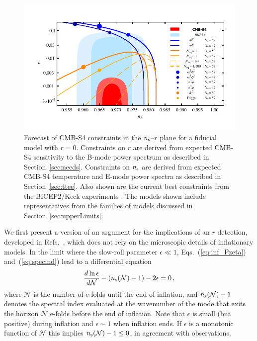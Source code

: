 \begin{figure}[ht]
\centering
\includegraphics[width=6in]{Inflation/nsrlabeledr0v3s}
\caption{Forecast of CMB-S4 constraints in the $n_{\rm s}$--$r$ plane for a fiducial model with $r=0$. Constraints 
on $r$ are derived from expected CMB-S4 sensitivity to the B-mode power spectrum as described in 
Section~\ref{sec:needs}. Constraints on $n_{\rm s}$ are derived from expected CMB-S4 temperature and 
E-mode power spectra as described in Section~\ref{sec:ttee}. Also shown are the current best constraints
from the BICEP2/Keck experiments \cite{Ade:2015fwj}. The models shown include representatives from 
the families of models discussed in Section~\ref{sec:upperLimits}.
}
\label{fig:nsr0}
\end{figure}

We first present a version of an argument for the implications of an $r$ detection, developed in Refs.~\cite{Mukhanov:2013tua,Roest:2013fha,Creminelli:2014nqa}, which does not rely on the microscopic details of inflationary models. In the limit where the slow-roll parameter $\epsilon\ll1$, Eqs.~(\ref{eq:inf_Pzeta}) and~(\ref{eq:specind}) lead to a differential equation
\begin{equation}\label{eq:epsdiffeq}
\frac{d\ln\epsilon}{d\mathcal{N}}-(n_{\rm s}(\mathcal{N})-1)-2\epsilon=0\,,
\end{equation} 
where $\mathcal{N}$ is the number of e-folds until the end of inflation, and $n_{\rm s}(\mathcal{N})-1$ denotes the spectral index evaluated at the wavenumber of the mode that exits the horizon $\mathcal{N}$ e-folds before the end of inflation. Note that $\epsilon$ is small (but positive) during inflation and $\epsilon\sim 1$ when inflation ends. If $\epsilon$ is a monotonic function of $\mathcal{N}$ this implies $n_{\rm s}(\mathcal{N})-1\leq 0$, in agreement with observations. 

